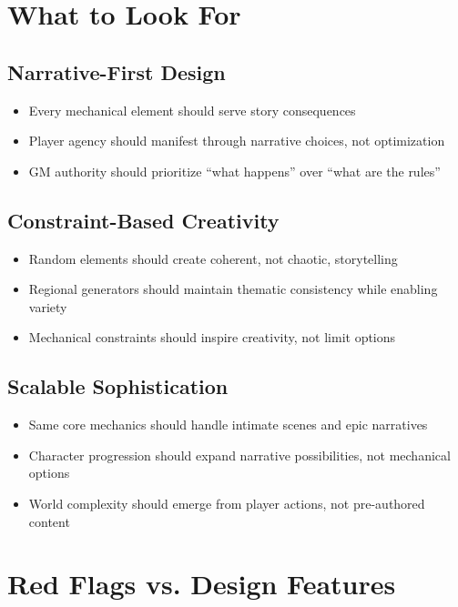 \documentclass[11pt]{article}
\begin{document}
\section{What to Look For}

\subsection{Narrative-First Design}
\begin{itemize}
    \item Every mechanical element should serve story consequences
    \item Player agency should manifest through narrative choices, not optimization
    \item GM authority should prioritize ``what happens'' over ``what are the rules''
\end{itemize}

\subsection{Constraint-Based Creativity}
\begin{itemize}
    \item Random elements should create coherent, not chaotic, storytelling
    \item Regional generators should maintain thematic consistency while enabling variety
    \item Mechanical constraints should inspire creativity, not limit options
\end{itemize}

\subsection{Scalable Sophistication}
\begin{itemize}
    \item Same core mechanics should handle intimate scenes and epic narratives
    \item Character progression should expand narrative possibilities, not mechanical options
    \item World complexity should emerge from player actions, not pre-authored content
\end{itemize}

\section{Red Flags vs. Design Features}
\end{document}
